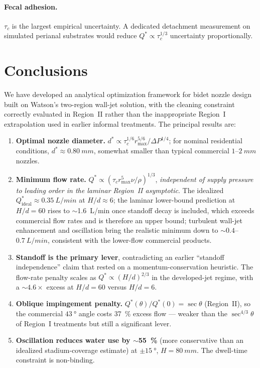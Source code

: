\documentclass[aps,prfluids,reprint,amsmath,amssymb,floatfix]{revtex4-2}
\begin{document}
\paragraph{Fecal adhesion.}
$\tau_c$ is the largest empirical uncertainty. A dedicated detachment
measurement on simulated perianal substrates would reduce
$Q^* \propto \tau_c^{1/3}$ uncertainty proportionally.

\section{Conclusions}
\label{sec:conclusions}

We have developed an analytical optimization framework for bidet nozzle
design built on Watson's two-region wall-jet solution, with the cleaning
constraint correctly evaluated in Region~II rather than the inappropriate
Region~I extrapolation used in earlier informal treatments. The principal
results are:

\begin{enumerate}[leftmargin=*, itemsep=4pt]
  \item \textbf{Optimal nozzle diameter.}
  $d^* \propto \tau_c^{1/6} r_\mathrm{max}^{5/6}/\Delta P^{1/4}$;
  for nominal residential conditions, $d^* \approx \SI{0.80}{mm}$,
  somewhat smaller than typical commercial $1$--$\SI{2}{mm}$ nozzles.

  \item \textbf{Minimum flow rate.}
  $Q^* \propto (\tau_c r_\mathrm{max}^5 \nu/\rho)^{1/3}$, \emph{independent
  of supply pressure to leading order in the laminar Region~II asymptotic}.
  The idealized $Q^*_\mathrm{ideal} \approx \SI{0.35}{L/min}$ at $H/d \approx 6$;
  the laminar lower-bound prediction at $H/d = 60$ rises to
  $\sim$\SI{1.6}{L/min} once standoff decay is included, which exceeds
  commercial flow rates and is therefore an upper bound; turbulent
  wall-jet enhancement and oscillation bring the realistic minimum
  down to $\sim 0.4$--$\SI{0.7}{L/min}$, consistent with the lower-flow
  commercial products.

  \item \textbf{Standoff is the primary lever}, contradicting an earlier
  ``standoff independence'' claim that rested on a momentum-conservation
  heuristic. The flow-rate penalty scales as $Q^* \propto (H/d)^{2/3}$
  in the developed-jet regime, with a $\sim 4.6\times$ excess at $H/d = 60$
  versus $H/d = 6$.

  \item \textbf{Oblique impingement penalty.}
  $Q^*(\theta)/Q^*(0) = \sec\theta$ (Region~II), so the commercial
  $\SI{43}{\degree}$ angle costs \SI{37}{\percent} excess flow ---
  weaker than the $\sec^{4/3}\theta$ of Region~I treatments but still
  a significant lever.

  \item \textbf{Oscillation reduces water use by $\sim$\SI{55}{\percent}}
  (more conservative than an idealized stadium-coverage estimate)
  at $\pm\SI{15}{\degree}$, $H = \SI{80}{mm}$. The dwell-time constraint
  is non-binding.
\end{enumerate}
\end{document}
